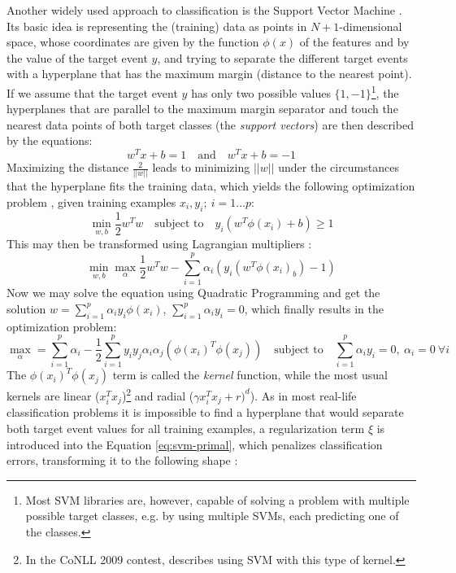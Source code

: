 \documentclass[12pt,notitlepage]{report}
\begin{document}
Another widely used approach to classification is the Support Vector Machine \citep{boser92}. Its basic idea is representing the (training) data as points in $N+1$-dimensional space, whose coordinates are given by the function $\phi(x)$ of the features and by the value of the target event $y$, and trying to separate the different target events with a hyperplane that has the maximum margin (distance to the nearest point). If we assume that the target event $y$ has only two possible values $\{1,-1\}$\footnote{Most SVM libraries are, however, capable of solving a problem with multiple possible target classes, e.g. by using multiple SVMs, each predicting one of the classes.}, the hyperplanes that are parallel to the maximum margin separator and touch the nearest data points of both target classes (the \emph{support vectors}) are then described by the equations:
\begin{equation}
w^T x + b = 1\quad\mbox{and}\quad w^T x + b = -1
\end{equation}
Maximizing the distance $\frac{2}{||w||}$ leads to minimizing $||w||$ under the circumstances that the hyperplane fits the training data, which yields the following optimization problem \citep{hsu03}, given training examples $x_i,y_i;\ i = 1\dots p$:
\begin{equation}\label{eq:svm-primal}
\min_{w,b} \frac{1}{2}w^T w\quad\mbox{subject to}\quad y_i(w^T\phi(x_i) + b)\geq 1
\end{equation}
This may then be transformed using Lagrangian multipliers \citep{cristianini00}:
\begin{equation}
\min_{w,b} \max_{\alpha} \frac{1}{2}w^T w - \sum_{i=1}^p \alpha_i(y_i(w^T\phi(x_i) _ b) - 1)
\end{equation}
Now we may solve the equation using Quadratic Programming and get the solution $w = \sum_{i=1}^p \alpha_i y_i \phi(x_i)$, $\sum_{i=1}^p \alpha_i y_i = 0$, which finally results in the optimization problem:
\begin{equation}
\max_{\alpha} = \sum_{i=1}^p \alpha_i - \frac{1}{2}\sum_{i=1}^p y_i y_j \alpha_i \alpha_j (\phi(x_i)^T \phi(x_j))\quad\mbox{subject to}\quad \sum_{i=1}^p \alpha_i y_i = 0,\ \alpha_i = 0\ \forall i
\end{equation}
The $\phi(x_i)^T \phi(x_j)$ term is called the \emph{kernel} function, while the most usual kernels are linear ($x_i^T x_j$)\footnote{In the CoNLL 2009 contest, \citet{che09} describes using SVM with this type of kernel.} and radial ($\gamma x_i^T x_j + r)^d$). As in most real-life classification problems it is impossible to find a hyperplane that would separate both target event values for all training examples, a regularization \citep{neumaier98} term $\xi$ is introduced into the Equation \ref{eq:svm-primal}, which penalizes classification errors, transforming it to the following shape \citep{cortes95}:
\end{document}
